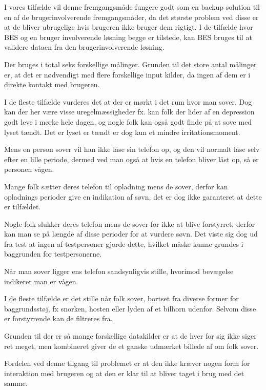 I vores tilfælde vil denne fremgangsmåde fungere godt som en backup solution til en af de brugerinvolverende fremgangsmåder, da det største problem ved disse er at de bliver ubrugelige hvis brugeren ikke bruger dem rigtigt.
I de tilfælde hvor BES og en bruger involverende løsning begge er tilstede, kan BES bruges til at validere dataen fra den brugerinvolverende løsning. 

Der bruges i total seks forskellige målinger.
Grunden til det store antal målinger er, at det er nødvendigt med flere forskellige input kilder, da ingen af dem er i direkte kontakt med brugeren.
\begin{description}[style=nextline]
\item[Lys]
I de fleste tilfælde vurderes det at der er mørkt i det rum hvor man sover. Dog kan der her være visse uregelmæssigheder fx. kan folk der lider af en depression godt leve i mørke hele dagen, og nogle folk kan også godt finde på at sove med lyset tændt. Det er lyset er tændt er dog kun et mindre irritationsmoment.
\item[Lås]
Mens en person sover vil han ikke låse sin telefon op, og den vil normalt låse selv efter en lille periode, dermed ved man også at hvis en telefon bliver låst op, så er personen vågen.
\item[Opladning]
Mange folk sætter deres telefon til opladning mens de sover, derfor kan opladnings perioder give en indikation af søvn, det er dog ikke garanteret at dette er tilfældet.
\item[Slukket]
Nogle folk slukker deres telefon mens de sover for ikke at blive forstyrret, derfor kan man se på længde af disse perioder for at vurdere søvn. Det viste sig dog ud fra test at ingen af testpersoner gjorde dette, hvilket måske kunne grundes i baggrunden for testpersonerne. 
\item[Bevægelse]
Når man sover ligger ens telefon sandsynligvis stille, hvorimod bevægelse indikerer man er vågen.
\item[Lyd]
I de fleste tilfælde er det stille når folk sover, bortset fra diverse former for baggrundsstøj, fx snorken, hosten eller  lyden af et bilhorn udenfor. Selvom disse er forstyrrende kan de filtreres fra.
\end{description}


Grunden til der er så mange forskellige datakilder er at de hver for sig ikke siger ret meget, men kombineret giver de et ganske udmærket billede af om folk sover.

Fordelen ved denne tilgang til problemet er at den ikke kræver nogen form for interaktion med brugeren og at den er klar til at bliver taget i brug med det samme.

